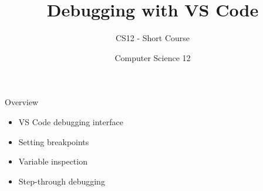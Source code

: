 \documentclass[10pt]{beamer}
\title{Debugging with VS Code}
\subtitle{CS12 - Short Course}
\author{Computer Science 12}
\date{}
\begin{document}
\begin{frame}
    \titlepage
\end{frame}

\begin{frame}{Overview}
    \begin{itemize}
        \item VS Code debugging interface
        \item Setting breakpoints
        \item Variable inspection
        \item Step-through debugging
    \end{itemize}
\end{frame}

\end{document}
